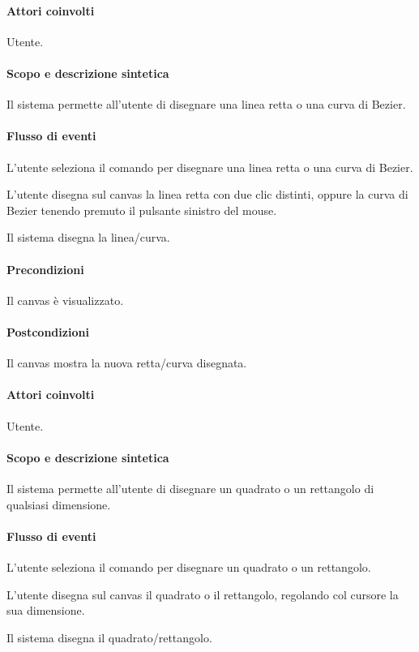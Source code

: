 \paragraph{Attori coinvolti} Utente.
\paragraph{Scopo e descrizione sintetica} 
Il sistema permette all'utente di disegnare una linea retta o una curva di Bezier.
\paragraph{Flusso di eventi}
\begin{elenconumerato}[\textbf{}]{\subsubsecindent}
\item L'utente seleziona il comando per disegnare una linea retta o una curva di Bezier.
\item L'utente disegna sul canvas la linea retta con due clic distinti, oppure la curva di Bezier tenendo premuto il pulsante sinistro del mouse.
\item Il sistema disegna la linea/curva.
\end{elenconumerato}
\paragraph{Precondizioni} Il canvas \`e visualizzato.
\paragraph{Postcondizioni} Il canvas mostra la nuova retta/curva disegnata.

\paragraph{Attori coinvolti} Utente.
\paragraph{Scopo e descrizione sintetica} 
Il sistema permette all'utente di disegnare un quadrato o un rettangolo di qualsiasi dimensione.
\paragraph{Flusso di eventi}
\begin{elenconumerato}[\textbf{}]{\subsubsecindent}
\item L'utente seleziona il comando per disegnare un quadrato o un rettangolo.
\item L'utente disegna sul canvas il quadrato o il rettangolo, regolando col cursore la sua dimensione.
\item Il sistema disegna il quadrato/rettangolo.
\end{elenconumerato}
